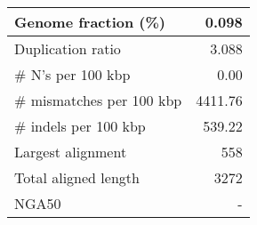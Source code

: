 \documentclass[12pt,a4paper]{article}
\begin{document}
\begin{table}[ht]
\begin{center}
\begin{tabular}{|l*{1}{|r}|}
Genome fraction (\%) & 0.098 \\ \hline
Duplication ratio & 3.088 \\ \hline
\# N's per 100 kbp & 0.00 \\ \hline
\# mismatches per 100 kbp & 4411.76 \\ \hline
\# indels per 100 kbp & 539.22 \\ \hline
Largest alignment & 558 \\ \hline
Total aligned length & 3272 \\ \hline
NGA50 & - \\ \hline
\end{tabular}
\end{center}
\end{table}
\end{document}
